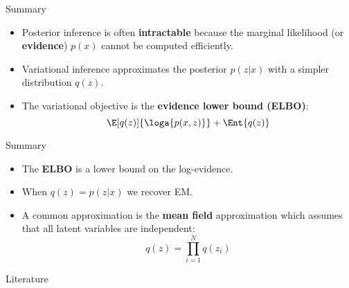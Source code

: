 \documentclass[14pt, aspectratio=169]{beamer}
\begin{document}
\begin{frame}{Summary}
\begin{itemize}
\item Posterior inference is often \textbf{intractable} because the marginal likelihood (or \textbf{evidence}) 
$ p(x) $ cannot be computed efficiently.
\item Variational inference approximates the posterior $ p(z|x) $ with a simpler distribution $ q(z) $.
\item The variational objective is the \textbf{evidence lower bound (ELBO)}:
\begin{equation*}
\E[q(z)]{\loga{p(x,z)}} + \Ent{q(z)}
\end{equation*}
\end{itemize}
\end{frame}

\begin{frame}{Summary}
\begin{itemize}
\item The \textbf{ELBO} is a lower bound on the log-evidence.
\item When $ q(z) = p(z|x) $ we recover EM.
\item A common approximation is the \textbf{mean field} approximation which assumes that all latent variables
are independent:
\begin{equation*}
q(z) = \prod_{i=1}^{N} q(z_{i})
\end{equation*}
\end{itemize}
\end{frame}

\nocite{BleiEtAl:2016}
\nocite{NealHinton:1998}
\nocite{GhahramaniJordan:1996}
\nocite{BleiEtAl:2003}

\begin{frame}[allowframebreaks]{Literature}

\small

\end{frame}
\end{document}
